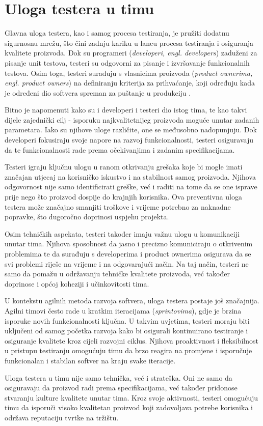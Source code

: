 \section{Uloga testera u timu}
Glavna uloga testera, kao i samog procesa testiranja, je pružiti dodatnu sigurnosnu mrežu, što čini zadnju kariku u lancu procesa testiranja i osiguranja kvalitete proizvoda.
Dok su programeri (\textit{developeri, engl. developers}) zaduženi za pisanje unit testova, testeri su odgovorni za pisanje i izvršavanje funkcionalnih testova.
Osim toga, testeri surađuju s vlasnicima proizvoda (\textit{product ownerima, engl. product owners}) na definiranju kriterija za prihvaćanje, koji određuju kada je određeni dio softvera spreman za puštanje u produkciju \cite{mundra2013practical}.

Bitno je napomenuti kako su i developeri i testeri dio istog tima, te kao takvi dijele zajednički cilj - isporuku najkvalitetnijeg proizvoda moguće unutar zadanih parametara.
Iako su njihove uloge različite, one se međusobno nadopunjuju.
Dok developeri fokusiraju svoje napore na razvoj funkcionalnosti, testeri osiguravaju da te funkcionalnosti rade prema očekivanjima i zadanim specifikacijama.

Testeri igraju ključnu ulogu u ranom otkrivanju grešaka koje bi mogle imati značajan utjecaj na korisničko iskustvo i na stabilnost samog proizvoda.
Njihova odgovornost nije samo identificirati greške, već i raditi na tome da se one isprave prije nego što proizvod dospije do krajnjih korisnika.
Ova preventivna uloga testera može značajno smanjiti troškove i vrijeme potrebno za naknadne popravke, što dugoročno doprinosi uspjehu projekta.

Osim tehničkih aspekata, testeri također imaju važnu ulogu u komunikaciji unutar tima.
Njihova sposobnost da jasno i precizno komuniciraju o otkrivenim problemima te da surađuju s developerima i product ownerima osigurava da se svi problemi riješe na vrijeme i na odgovarajući način.
Na taj način, testeri ne samo da pomažu u održavanju tehničke kvalitete proizvoda, već također doprinose i općoj koheziji i učinkovitosti tima.

U kontekstu agilnih metoda razvoja softvera, uloga testera postaje još značajnija.
Agilni timovi često rade u kratkim iteracijama (\textit{sprintovima}), gdje je brzina isporuke novih funkcionalnosti ključna.
U takvim uvjetima, testeri moraju biti uključeni od samog početka razvoja kako bi osigurali kontinuirano testiranje i osiguranje kvalitete kroz cijeli razvojni ciklus.
Njihova proaktivnost i fleksibilnost u pristupu testiranju omogućuju timu da brzo reagira na promjene i isporučuje funkcionalan i stabilan softver na kraju svake iteracije.

Uloga testera u timu nije samo tehnička, već i strateška.
Oni ne samo da osiguravaju da proizvod radi prema specifikacijama, već također pridonose stvaranju kulture kvalitete unutar tima.
Kroz svoje aktivnosti, testeri omogućuju timu da isporuči visoko kvalitetan proizvod koji zadovoljava potrebe korisnika i održava reputaciju tvrtke na tržištu.